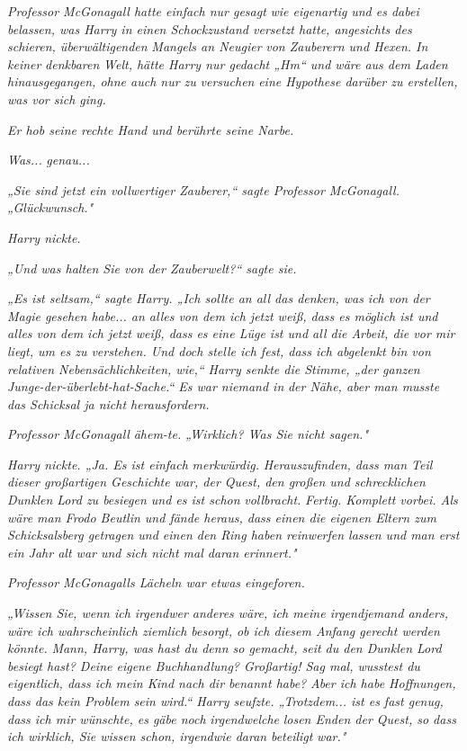 {\emph{Professor McGonagall hatte einfach nur gesagt} \emph{\emph{wie eigenartig}} \emph{und es dabei belassen, was Harry in einen Schockzustand versetzt hatte, angesichts des schieren, überwältigenden} \emph{\emph{Mangels an Neugier}} \emph{von Zauberern und Hexen. In keiner} \emph{\emph{denkbaren}} \emph{Welt, hätte Harry nur gedacht „Hm“ und wäre aus dem Laden hinausgegangen, ohne auch nur zu} \emph{\emph{versuchen}} \emph{eine Hypothese darüber zu erstellen, was vor sich ging.}

\emph{Er hob seine rechte Hand und berührte seine Narbe.}

\emph{Was...} \emph{\emph{genau...}}

\emph{„Sie sind jetzt ein vollwertiger Zauberer,“ sagte Professor McGonagall. „Glückwunsch."}

\emph{Harry nickte.}

\emph{„Und was halten Sie von der Zauberwelt?“ sagte sie.}

\emph{„Es ist seltsam,“ sagte Harry. „Ich sollte an all das denken, was ich von der Magie gesehen habe... an alles von dem ich jetzt weiß, dass es möglich ist und alles von dem ich jetzt weiß, dass es eine Lüge ist und all die Arbeit, die vor mir liegt, um es zu verstehen. Und doch stelle ich fest, dass ich abgelenkt bin von relativen Nebensächlichkeiten, wie,“ Harry senkte die Stimme, „der ganzen Junge-der-überlebt-hat-Sache.“ Es war niemand in} \emph{der Nähe, aber man musste das Schicksal ja nicht herausfordern.}

\emph{Professor McGonagall} \emph{\emph{ähem-te.}} \emph{„Wirklich? Was Sie nicht sagen."}

\emph{Harry nickte. „Ja. Es ist einfach} \emph{\emph{merkwürdig.}} \emph{Herauszufinden, dass man Teil dieser großartigen Geschichte war, der Quest, den großen und schrecklichen Dunklen Lord zu besiegen und es ist schon} \emph{\emph{vollbracht.}} \emph{Fertig. Komplett vorbei. Als wäre man Frodo Beutlin und fände heraus, dass einen die eigenen Eltern zum Schicksalsberg getragen und einen den Ring haben reinwerfen lassen und man erst ein Jahr alt war und sich nicht mal daran erinnert."}

\emph{Professor McGonagalls Lächeln war etwas eingeforen.}

\emph{„Wissen Sie, wenn ich irgendwer anderes wäre, ich meine irgendjemand anders, wäre ich wahrscheinlich ziemlich besorgt, ob ich diesem Anfang gerecht werden könnte.} \emph{\emph{Mann, Harry, was hast du denn so gemacht, seit du den Dunklen Lord besiegt hast? Deine eigene Buchhandlung? Großartig! Sag mal, wusstest du eigentlich, dass ich mein Kind nach dir benannt habe?}} \emph{Aber ich habe Hoffnungen, dass das kein Problem sein wird.“ Harry seufzte. „Trotzdem... ist es fast genug, dass ich mir wünschte, es gäbe noch} \emph{\emph{irgendwelche}} \emph{losen Enden der Quest, so dass ich wirklich, Sie wissen schon, irgendwie daran} \emph{\emph{beteiligt}} \emph{war."}

}
